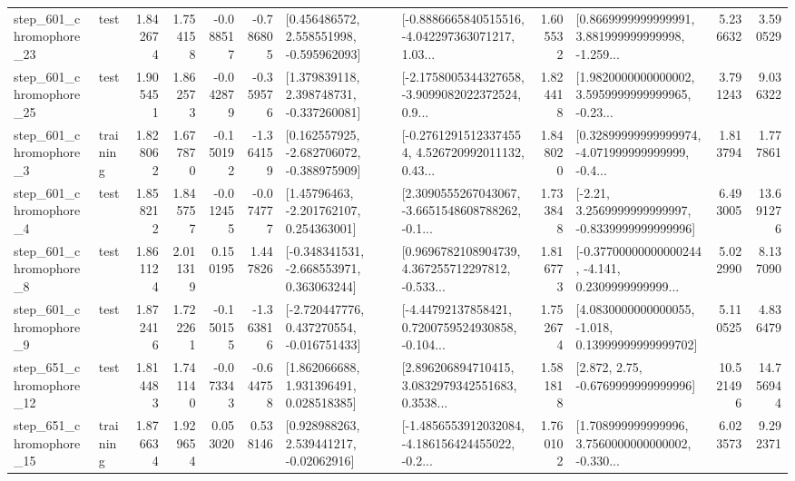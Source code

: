\begin{tabular}{llrrrrllrlrr}
  step\_601\_chromophore\_23 &      test &      1.842674 &    1.754158 &     -0.088517 & -0.786805 &    [0.456486572, 2.558551998, -0.595962093] &  [-0.8886665840515516, -4.042297363071217, 1.03... &       1.605532 &  [0.8669999999999991, 3.881999999999998, -1.259... &            5.236632 &          3.590529 \\
  step\_601\_chromophore\_25 &      test &      1.905451 &    1.862573 &     -0.042879 & -0.359576 &    [1.379839118, 2.398748731, -0.337260081] &  [-2.1758005344327658, -3.9099082022372524, 0.9... &       1.824418 &  [1.9820000000000002, 3.5959999999999965, -0.23... &            3.791243 &          9.036322 \\
   step\_601\_chromophore\_3 &  training &      1.828062 &    1.677870 &     -0.150192 & -1.364159 &   [0.162557925, -2.682706072, -0.388975909] &  [-0.27612915123374554, 4.526720992011132, 0.43... &       1.848020 &  [0.32899999999999974, -4.071999999999999, -0.4... &            1.813794 &          1.777861 \\
   step\_601\_chromophore\_4 &      test &      1.858212 &    1.845757 &     -0.012455 & -0.074777 &     [1.45796463, -2.201762107, 0.254363001] &  [2.3090555267043067, -3.6651548608788262, -0.1... &       1.733848 &   [-2.21, 3.2569999999999997, -0.8339999999999996] &            6.493005 &         13.691276 \\
   step\_601\_chromophore\_8 &      test &      1.861124 &    2.011319 &      0.150195 &  1.447826 &   [-0.348341531, -2.668553971, 0.363063244] &  [0.9696782108904739, 4.367255712297812, -0.533... &       1.816773 &  [-0.37700000000000244, -4.141, 0.2309999999999... &            5.022990 &          8.137090 \\
   step\_601\_chromophore\_9 &      test &      1.872416 &    1.722261 &     -0.150155 & -1.363816 &   [-2.720447776, 0.437270554, -0.016751433] &  [-4.44792137858421, 0.7200759524930858, -0.104... &       1.752674 &  [4.0830000000000055, -1.018, 0.13999999999999702] &            5.110525 &          4.836479 \\
  step\_651\_chromophore\_12 &      test &      1.814483 &    1.741140 &     -0.073343 & -0.644758 &     [1.862066688, 1.931396491, 0.028518385] &  [2.896206894710415, 3.0832979342551683, 0.3538... &       1.581818 &                 [2.872, 2.75, -0.6769999999999996] &           10.521496 &         14.756944 \\
  step\_651\_chromophore\_15 &  training &      1.876634 &    1.929654 &      0.053020 &  0.538146 &     [0.928988263, 2.539441217, -0.02062916] &  [-1.4856553912032084, -4.186156424455022, -0.2... &       1.760102 &  [1.708999999999996, 3.7560000000000002, -0.330... &            6.023573 &          9.292371 \\

\end{tabular}

